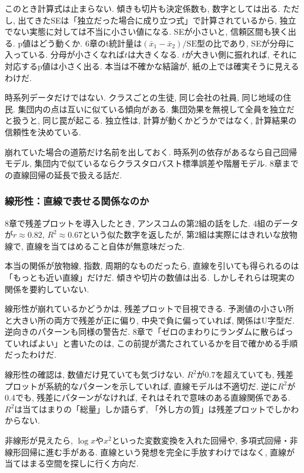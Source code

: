 このとき計算式は止まらない. 傾きも切片も決定係数も, 数字としては出る.
ただし, 出てきたSEは「独立だった場合に成り立つ式」で計算されているから, 独立でない実態に対しては不当に小さい値になる.
SEが小さいと, 信頼区間も狭く出る.
p値はどう動くか. 6章のt統計量は$(\bar{x}_1-\bar{x}_2)/\mathrm{SE}$型の比であり, SEが分母に入っている.
分母が小さくなれば$t$は大きくなる. $t$が大きい側に振れれば, それに対応するp値は小さく出る.
本当は不確かな結論が, 紙の上では確実そうに見えるわけだ.

時系列データだけではない. クラスごとの生徒, 同じ会社の社員, 同じ地域の住民. 集団内の点は互いに似ている傾向がある.
集団効果を無視して全員を独立だと扱うと, 同じ罠が起こる.
独立性は, 計算が動くかどうかではなく, 計算結果の信頼性を決めている.

崩れていた場合の道筋だけ名前を出しておく. 時系列の依存があるなら自己回帰モデル, 集団内で似ているならクラスタロバスト標準誤差や階層モデル. 8章までの直線回帰の延長で扱える話だ.

\subsubsection*{線形性：直線で表せる関係なのか}

8章で残差プロットを導入したとき, アンスコムの第2組の話をした.
4組のデータが$r \approx 0.82$, $R^2 \approx 0.67$という似た数字を返したが, 第2組は実際にはきれいな放物線で, 直線を当てはめること自体が無意味だった.

本当の関係が放物線, 指数, 周期的なものだったら, 直線を引いても得られるのは「もっとも近い直線」だけだ.
傾きや切片の数値は出る. しかしそれらは現実の関係を要約していない.

線形性が崩れているかどうかは, 残差プロットで目視できる.
予測値の小さい所と大きい所の両方で残差が正に偏り, 中央で負に偏っていれば, 関係はU字型だ.
逆向きのパターンも同様の警告だ.
8章で「ゼロのまわりにランダムに散らばっていればよい」と書いたのは, この前提が満たされているかを目で確かめる手順だったわけだ.

線形性の確認は, 数値だけ見ていても気づけない.
$R^2$が0.7を超えていても, 残差プロットが系統的なパターンを示していれば, 直線モデルは不適切だ.
逆に$R^2$が0.4でも, 残差にパターンがなければ, それはそれで意味のある直線関係である.
$R^2$は当てはまりの「総量」しか語らず, 「外し方の質」は残差プロットでしかわからない.

非線形が見えたら, $\log x$や$x^2$といった変数変換を入れた回帰や, 多項式回帰・非線形回帰に進む手がある. 直線という発想を完全に手放すわけではなく, 直線が当てはまる空間を探しに行く方向だ.

